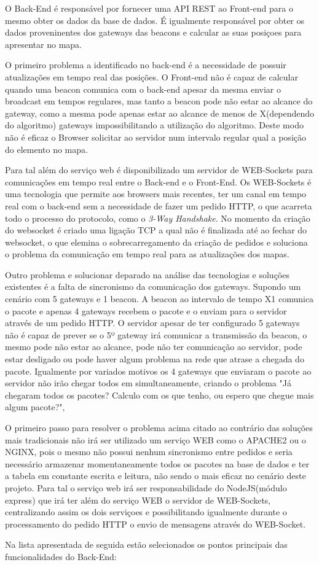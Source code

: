 \par O Back-End é responsável por fornecer uma API REST ao Front-end para o mesmo obter os dados da base de dados. É igualmente responsável por obter os dados proveninentes dos gateways das beacons e calcular as suas posiçoes para apresentar no mapa. 
\par O primeiro problema a identificado no back-end é a necessidade de possuir atualizações em tempo real das posições. O Front-end não é capaz de calcular quando uma beacon comunica com o back-end apesar da mesma enviar o broadcast em tempos regulares, mas tanto a beacon  pode não estar ao alcance do gateway, como a mesma pode apenas estar ao alcance de menos de X(dependendo do algoritmo) gateways impossibilitando a utilização do algoritmo. Deste modo não é eficaz o Browser solicitar ao servidor num intervalo regular qual a posição do elemento no mapa.
\par Para tal além do serviço web é disponibilizado um servidor de WEB-Sockets para comunicações em tempo real entre o Back-end e o Front-End. Os WEB-Sockets é uma tecnologia que permite aos browsers mais recentes, ter um canal em tempo real com o back-end sem a necessidade de fazer um pedido HTTP, o que acarreta todo o processo do protocolo, como o \textit{3-Way Handshake}. No momento da criação do websocket é criado uma ligação TCP a qual não é finalizada até ao fechar do websocket, o que elemina o sobrecarregamento da criação de pedidos e soluciona o problema da comunicação em tempo real para as atualizações dos mapas.
\par Outro problema e solucionar deparado na análise das tecnologias e soluções existentes é a falta de sincronismo da comunicação dos gateways. Supondo um cenário com 5 gateways e 1 beacon. A beacon ao intervalo de tempo X1 comunica o pacote e apenas 4 gateways recebem o pacote e o enviam para o servidor através de um pedido HTTP. O servidor apesar de ter configurado 5 gateways não é capaz de prever se o 5º gateway irá comunicar a transmissão da beacon, o mesmo pode não estar ao alcance, pode não ter comunicação ao servidor, pode estar desligado ou pode haver algum problema na rede que atrase a chegada do pacote. Igualmente por variados motivos os 4 gateways que enviaram o pacote ao servidor não irão chegar todos em simultaneamente, criando o problema "Já chegaram todos os pacotes? Calculo com os que tenho, ou espero que chegue mais algum pacote?",
\par O primeiro passo para resolver o problema acima citado ao contrário das soluções mais tradicionais não irá ser utilizado um serviço WEB como o APACHE2 ou o NGINX, pois o mesmo não possui nenhum sincronismo entre pedidos e seria necessário armazenar momentaneamente todos os pacotes na base de dados e ter a tabela em constante escrita e leitura, não sendo o mais eficaz no cenário deste projeto. Para tal o serviço web irá ser responsabilidade do NodeJS(módulo express) que irá ter além do serviço WEB o servidor de WEB-Sockets, centralizando assim os dois serviçoes e possibilitando igualmente durante o processamento do pedido HTTP o envio de mensagens através do WEB-Socket. 
\par Na lista apresentada de seguida estão selecionados os pontos principais das funcionalidades do Back-End:

